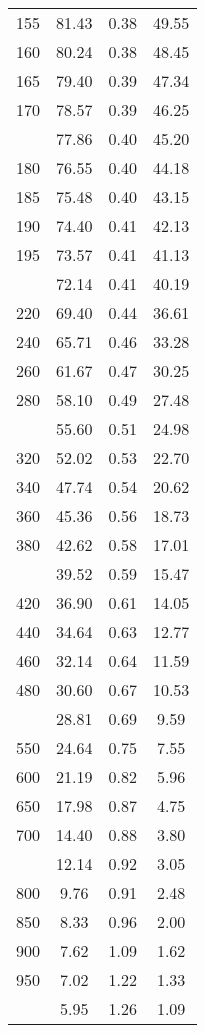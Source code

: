 \begin{table}[ht]
\begin{tabular}{lccc}
  155 & 81.43 & 0.38 & 49.55 \\ 
  160 & 80.24 & 0.38 & 48.45 \\ 
  165 & 79.40 & 0.39 & 47.34 \\ 
  170 & 78.57 & 0.39 & 46.25 \\ 
   \addlinespace
175 & 77.86 & 0.40 & 45.20 \\ 
  180 & 76.55 & 0.40 & 44.18 \\ 
  185 & 75.48 & 0.40 & 43.15 \\ 
  190 & 74.40 & 0.41 & 42.13 \\ 
  195 & 73.57 & 0.41 & 41.13 \\ 
   \addlinespace
200 & 72.14 & 0.41 & 40.19 \\ 
  220 & 69.40 & 0.44 & 36.61 \\ 
  240 & 65.71 & 0.46 & 33.28 \\ 
  260 & 61.67 & 0.47 & 30.25 \\ 
  280 & 58.10 & 0.49 & 27.48 \\ 
   \addlinespace
300 & 55.60 & 0.51 & 24.98 \\ 
  320 & 52.02 & 0.53 & 22.70 \\ 
  340 & 47.74 & 0.54 & 20.62 \\ 
  360 & 45.36 & 0.56 & 18.73 \\ 
  380 & 42.62 & 0.58 & 17.01 \\ 
   \addlinespace
400 & 39.52 & 0.59 & 15.47 \\ 
  420 & 36.90 & 0.61 & 14.05 \\ 
  440 & 34.64 & 0.63 & 12.77 \\ 
  460 & 32.14 & 0.64 & 11.59 \\ 
  480 & 30.60 & 0.67 & 10.53 \\ 
   \addlinespace
500 & 28.81 & 0.69 & 9.59 \\ 
  550 & 24.64 & 0.75 & 7.55 \\ 
  600 & 21.19 & 0.82 & 5.96 \\ 
  650 & 17.98 & 0.87 & 4.75 \\ 
  700 & 14.40 & 0.88 & 3.80 \\ 
   \addlinespace
750 & 12.14 & 0.92 & 3.05 \\ 
  800 & 9.76 & 0.91 & 2.48 \\ 
  850 & 8.33 & 0.96 & 2.00 \\ 
  900 & 7.62 & 1.09 & 1.62 \\ 
  950 & 7.02 & 1.22 & 1.33 \\ 
   \addlinespace
1000 & 5.95 & 1.26 & 1.09 \\ 
   \bottomrule
\end{tabular}
\end{table}
